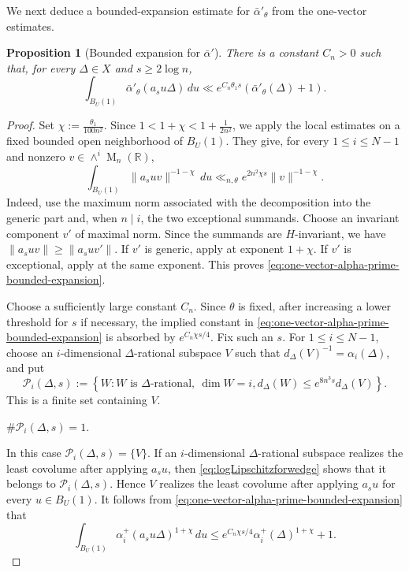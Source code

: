 \documentclass[reqno,11pt]{amsart}
\numberwithin{equation}{section}
\newtheorem{proposition}[theorem]{Proposition}
\theoremstyle{definition}
\theoremstyle{remark}
\newcommand{\op}{\operatorname}
\newcommand{\M}{\op{M}}
\begin{document}
We next deduce a bounded-expansion estimate for $\bar\alpha'_\theta$ from
the one-vector estimates.
\begin{proposition}[Bounded expansion for $\bar{\alpha}'$]\label{prop:globalboundedexpansion''}
There is a constant $C_n>0$ such that, for every $\Delta\in X$ and 
$s\ge 2\log n$,
\begin{equation}\label{eq:globalboundedexpansion''}
\int_{B_{U}(1)}
\bar\alpha'_\theta(a_su\Delta)\,du
\ll
e^{C_n\theta_1s}
\left(\bar\alpha'_\theta(\Delta)+1\right).
\end{equation}
\end{proposition}

\begin{proof}  Set
$\chi:=\frac{\theta_1}{100n^2}$.
Since $1<1+\chi<1+\frac1{2n^2}$, we apply the local estimates on a fixed bounded open neighborhood of
$B_{U}(1)$. They give, for every $1\le i\le N-1$ and nonzero
$v\in\wedge^i\M_n(\mathbb R)$,
\begin{equation}\label{eq:one-vector-alpha-prime-bounded-expansion}
\int_{B_{U}(1)}
\|a_suv\|^{-1-\chi}\,du
\ll_{n,\theta}
e^{2n^2\chi s}\|v\|^{-1-\chi}.
\end{equation}
Indeed, use the maximum norm associated with the decomposition into the
generic part and, when $n\mid i$, the two exceptional summands. Choose
an invariant component $v'$ of maximal norm. Since the summands are
$H$-invariant, we have $\|a_suv\|\ge\|a_suv'\|$. If $v'$ is generic, apply
 at exponent $1+\chi$.
If $v'$ is exceptional, apply
 at the same exponent. This proves
\eqref{eq:one-vector-alpha-prime-bounded-expansion}.

Choose a sufficiently large constant $C_n$. Since $\theta$
is fixed, after increasing a lower threshold for $s$ if necessary, the
implied constant in
\eqref{eq:one-vector-alpha-prime-bounded-expansion} is absorbed by
$e^{C_n\chi s/4}$. Fix such an $s$. For $1\le i\le N-1$, choose an
$i$-dimensional $\Delta$-rational subspace $V$ such that
$d_\Delta(V)^{-1}=\alpha_i(\Delta)$, and put
$$
\mathcal P_i(\Delta,s)
:=
\left\{
W:
W\text{ is $\Delta$-rational},\ \dim W=i,
d_\Delta(W)\le e^{8n^3s}d_\Delta(V)
\right\}.
$$
This is a finite set containing $V$.

 $\#\mathcal P_i(\Delta,s)=1$.

In this case $\mathcal P_i(\Delta,s)=\{V\}$. If an $i$-dimensional
$\Delta$-rational subspace realizes the least covolume after applying
$a_su$, then \eqref{eq:logLipschitzforwedge} shows that it belongs to
$\mathcal P_i(\Delta,s)$. Hence $V$ realizes the least covolume after
applying $a_su$ for every $u\in B_{U}(1)$. It follows from
\eqref{eq:one-vector-alpha-prime-bounded-expansion} that
\begin{equation}\label{eq:alpha-prime-case-one}
\int_{B_{U}(1)}
\alpha_i^+(a_su\Delta)^{1+\chi}\,du
\le
e^{C_n\chi s/4}\alpha_i^+(\Delta)^{1+\chi}+1.
\end{equation}


\end{proof}
\end{document}
